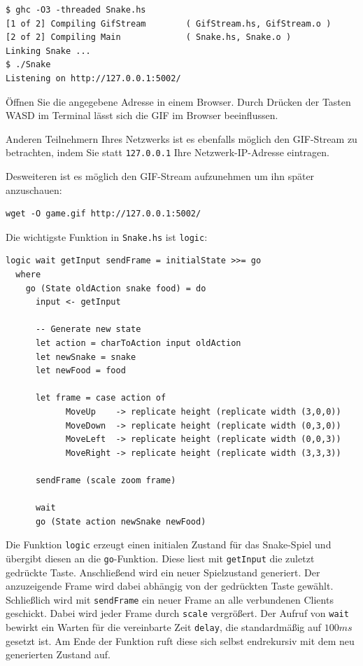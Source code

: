 \documentclass{scrartcl}
\begin{document}
\begin{lstlisting}
$ ghc -O3 -threaded Snake.hs
[1 of 2] Compiling GifStream        ( GifStream.hs, GifStream.o )
[2 of 2] Compiling Main             ( Snake.hs, Snake.o )
Linking Snake ...
$ ./Snake
Listening on http://127.0.0.1:5002/
\end{lstlisting}

Öffnen Sie die angegebene Adresse in einem Browser.
Durch Drücken der Tasten WASD im Terminal lässt sich die GIF im Browser beeinflussen.

Anderen Teilnehmern Ihres Netzwerks ist es ebenfalls möglich den GIF-Stream zu betrachten, indem Sie statt \texttt{127.0.0.1} Ihre Netzwerk-IP-Adresse eintragen.

Desweiteren ist es möglich den GIF-Stream aufzunehmen um ihn später anzuschauen:

\begin{lstlisting}
wget -O game.gif http://127.0.0.1:5002/
\end{lstlisting}

Die wichtigste Funktion in \texttt{Snake.hs} ist \texttt{logic}:

\begin{lstlisting}
logic wait getInput sendFrame = initialState >>= go
  where
    go (State oldAction snake food) = do
      input <- getInput

      -- Generate new state
      let action = charToAction input oldAction
      let newSnake = snake
      let newFood = food

      let frame = case action of
            MoveUp    -> replicate height (replicate width (3,0,0))
            MoveDown  -> replicate height (replicate width (0,3,0))
            MoveLeft  -> replicate height (replicate width (0,0,3))
            MoveRight -> replicate height (replicate width (3,3,3))

      sendFrame (scale zoom frame)

      wait
      go (State action newSnake newFood)
\end{lstlisting}

Die Funktion \texttt{logic} erzeugt einen initialen Zustand für das Snake-Spiel und übergibt diesen an die \texttt{go}-Funktion.
Diese liest mit \texttt{getInput} die zuletzt gedrückte Taste.
Anschließend wird ein neuer Spielzustand generiert.
Der anzuzeigende Frame wird dabei abhängig von der gedrückten Taste gewählt.
Schließlich wird mit \texttt{sendFrame} ein neuer Frame an alle verbundenen Clients geschickt.
Dabei wird jeder Frame durch \texttt{scale} vergrößert.
Der Aufruf von \texttt{wait} bewirkt ein Warten für die vereinbarte Zeit \texttt{delay}, die standardmäßig auf $100 ms$ gesetzt ist.
Am Ende der Funktion ruft diese sich selbst endrekursiv mit dem neu generierten Zustand auf.
\end{document}
